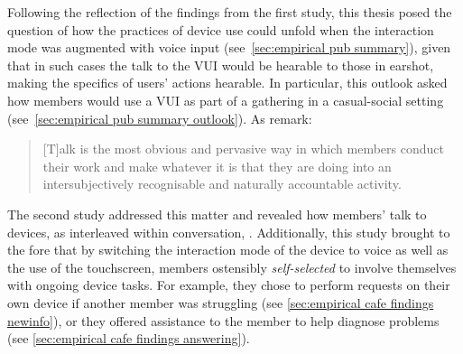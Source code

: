 \begin{revisedsubmission}
Following the reflection of the findings from the first study, this thesis posed the question of how the practices of device use could unfold when the interaction mode was augmented with voice input (see~\ref{sec:empirical pub summary}), given that in such cases the talk to the \ac{VUI} would be hearable to those in earshot, making the specifics of users' actions hearable.
In particular, this outlook asked how members would use a \ac{VUI} as part of a gathering in a casual-social setting (see~\ref{sec:empirical pub summary outlook}).
As \citet{Crabtree2012} remark:
\begin{quote}
    [T]alk is the most obvious and pervasive way in which members conduct their work and make whatever it is that they are doing into an intersubjectively recognisable and naturally accountable activity.
\end{quote}
\end{revisedsubmission}
The second study addressed this matter and revealed how members' talk to devices, as interleaved within conversation, .
Additionally, this study brought to the fore that by switching the interaction mode of the device to voice as well as the use of the touchscreen, members ostensibly \textit{self-selected} to involve themselves with ongoing device tasks.
For example, they chose to perform requests on their own device if another member was struggling (see \ref{sec:empirical cafe findings newinfo}), or they offered assistance to the member to help diagnose problems (see \ref{sec:empirical cafe findings answering}).
